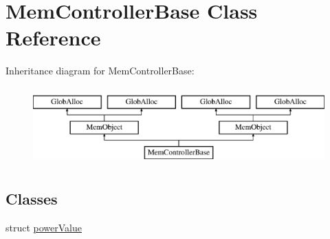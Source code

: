 \hypertarget{classMemControllerBase}{\section{Mem\-Controller\-Base Class Reference}
\label{classMemControllerBase}
}
Inheritance diagram for Mem\-Controller\-Base\-:\begin{figure}[H]
\begin{center}
\leavevmode
\includegraphics[height=3.000000cm]{classMemControllerBase}
\end{center}
\end{figure}
\subsection*{Classes}
\begin{DoxyCompactItemize}
\item 
struct \hyperlink{structMemControllerBase_1_1powerValue}{power\-Value}
\end{DoxyCompactItemize}
